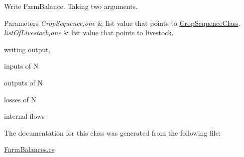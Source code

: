 Write Farm\+Balance. Taking two arguments. 


\begin{DoxyParams}{Parameters}
{\em Crop\+Sequence,one} & list value that points to \mbox{\hyperlink{class_crop_sequence_class}{Crop\+Sequence\+Class}}. \\
\hline
{\em list\+Of\+Livestock,one} & list value that points to livestock. \\
\hline
\end{DoxyParams}
writing output.

inputs of N

outputs of N

losses of N

internal flows 

The documentation for this class was generated from the following file\+:\begin{DoxyCompactItemize}
\item 
\mbox{\hyperlink{_farm_balances_8cs}{Farm\+Balances.\+cs}}\end{DoxyCompactItemize}
